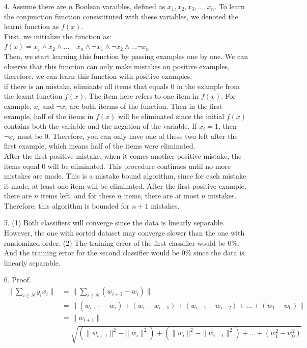 \documentclass[11pt]{article}
\begin{document}
\begin{itemize}
\item[4.]
Assume there are \(n\) Boolean varaibles, defined as \(x_1,x_2,x_3,...,x_n\). To learn the conjunction function consistituted with these variables, we denoted the learnt function as \(f(x)\).\\
First, we initialize the function as: \(f(x)=x_1 \wedge x_2 \wedge ... \quad x_n \wedge \neg x_1 \wedge \neg x_2 \wedge ... \neg x_n\)\\
Then, we start learning this function by passing examples one by one. We can observe that this function can only make mistakes on positive examples, therefore, we can learn this function with positive examples.\\
if there is an mistake, eliminate all items that equals 0 in the example from the learnt function \(f(x)\). The  item here refers to one item in \(f(x)\). For example, \(x_i\) and \(\neg x_i\) are both iterms of the function. Then in the first example, half of the items in \(f(x)\) will be eliminated since the initial \(f(x)\) contains both the variable and the negation of the variable. If \(x_i=1\), then \(\neg x_i\) must be 0. Therefore, you can only have one of these two left after the first example, which means half of the items were eliminated.\\
After the first positive mistake, when it comes another positive mistake, the items equal \(0\) will be eliminated. This procedure continues until no more mistakes are made. This is a mistake bound algorithm, since for each mistake it made, at least one item will be eliminated. After the first positive example, there are \(n\) items left, and for these \(n\) items, there are at most \(n\) mistakes. Therefore, this algorithm is bounded for \(n+1\) mistakes.
\item[5.]
(1) Both classifiers will converge since the data is linearly separable. However, the one with sorted dataset may converge slower than the one with randomized order.
(2) The training error of the first classifier would be 0\%. And the training error for the second classifier would be 0\% since the data is linearly separable.
\item[6.]
Proof.
\begin{align*}
\|\sum_{i\in N} y_i x_i\| & = \|\sum_{i\in N} (w_{i+1}-w_i)\| \\
                          & = \| (w_{i+1}-w_i)+(w_i-w_{i-1})+(w_{i-1}-w_{i-2})+...+(w_1-w_0) \| \\
													& = \|w_{i+1}\| \\
													& = \sqrt{(\|w_{i+1}\|^2-\|w_i\|^2)+(\|w_i\|^2-\|w_{i-1}\|^2)+...+(w_1^2-w_0^2)} \\

\end{align*}
\end{itemize}
\end{document}
